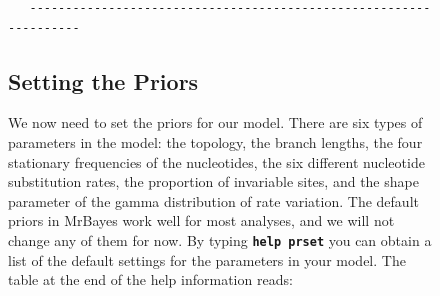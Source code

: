 \documentclass[12pt]{book}
\newcommand{\ttt}[1]{\texttt{#1}}
\newcommand{\tb}[1]{\ttt{\textbf{#1}}}
\begin{document}
\begin{figure}[h]
\begin{singlespacing}
\begin{verbatim}
   ------------------------------------------------------------------
\end{verbatim}
\normalsize
\end{singlespacing}

\subsection{Setting the Priors}

We now need to set the priors for our model. There are six types of parameters in the model: the
topology, the branch lengths, the four stationary frequencies of the nucleotides, the six different
nucleotide substitution rates, the proportion of invariable sites, and the shape parameter of the
gamma distribution of rate variation. The default priors in MrBayes work well for most analyses,
and we will not change any of them for now. By typing \tb{help prset} you can obtain a list of the
default settings for the parameters in your model. The table at the end of the help information
reads:


\end{figure}
\end{document}
